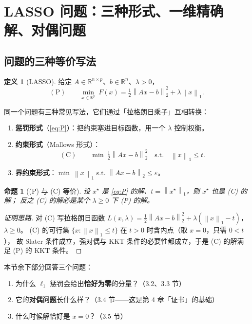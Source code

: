 \documentclass[11pt,a4paper,UTF8]{ctexart}
\theoremstyle{plain}
\newtheorem{proposition}[theorem]{命题}
\theoremstyle{definition}
\newtheorem{definition}[theorem]{定义}
\theoremstyle{remark}
\newcommand{\R}{\mathbb{R}}
\newcommand{\norm}[1]{\left\lVert #1 \right\rVert}
\newcommand{\eps}{\varepsilon}
\begin{document}
\section{LASSO 问题：三种形式、一维精确解、对偶问题}

\subsection{问题的三种等价写法}

\begin{definition}[LASSO]
给定 $A\in\R^{n\times p}$、$b\in\R^n$、$\lambda>0$，
\begin{equation}
(\mathrm{P})\qquad \min_{x\in\R^p}\ F(x)=\tfrac12\norm{Ax-b}_2^2+\lambda\norm{x}_1 .
\label{eq:P}
\end{equation}
\end{definition}

同一个问题有三种常见写法，它们通过「拉格朗日乘子」互相转换：

\begin{enumerate}
\item \textbf{惩罚形式}（\eqref{eq:P}）：把约束塞进目标函数，用一个 $\lambda$ 控制权衡。
\item \textbf{约束形式}（Mallows 形式）：
\[
(\mathrm{C})\qquad \min\ \tfrac12\norm{Ax-b}_2^2\quad\text{s.t.}\quad \norm{x}_1\le t .
\]
\item \textbf{界约束形式}：$\min\ \norm{x}_1$ s.t. $\norm{Ax-b}_2\le\eps$。
\end{enumerate}

\begin{proposition}[(P) 与 (C) 等价]\label{prop:equiv}
设 $x^\star$ 是 \eqref{eq:P} 的解、$t=\norm{x^\star}_1$，则 $x^\star$ 也是 (C) 的解；
反之 (C) 的解必是某个 $\lambda\ge0$ 下 (P) 的解。
\end{proposition}

\begin{proof}[证明思路]
对 (C) 写拉格朗日函数 $L(x,\lambda)=\tfrac12\norm{Ax-b}_2^2+\lambda(\norm{x}_1-t)$，$\lambda\ge0$。
(C) 的可行集 $\{x:\norm{x}_1\le t\}$ 在 $t>0$ 时含内点（取 $x=0$，只需 $0<t$），
故 Slater 条件成立，强对偶与 KKT 条件的必要性都成立，于是 (C) 的解满足 (P) 的 KKT 条件。
\end{proof}

本节余下部分回答三个问题：
\begin{enumerate}
\item[(Q1)] 为什么 $\ell_1$ 惩罚会给出\textbf{恰好为零}的分量？（3.2、3.3 节）
\item[(Q2)] 它的\textbf{对偶问题}长什么样？（3.4 节——这是第 4 章「证书」的基础）
\item[(Q3)] 什么时候解恰好是 $x=0$？（3.5 节）
\end{enumerate}
\end{document}

